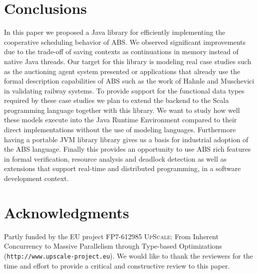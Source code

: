\section{Conclusions}
In this paper we proposed a Java library for efficiently implementing the cooperative scheduling behavior of ABS. We observed significant improvements due to the trade-off of saving contexts as continuations in memory instead of native Java threads. Our target for this library is modeling real case studies such as the auctioning agent system presented or applications that already use the formal description capabilities of ABS such as the work of Hahnle and Muschevici in validating railway systems\cite{railway}. To provide support for the functional data types required by these case studies we plan to extend the backend to the Scala programming language together with this library. We want to study how well these models execute into the Java Runtime Environment compared to their direct implementations without the use of modeling languages. Furthermore having a portable JVM library library gives us a basis for industrial adoption of the ABS language.  Finally this provides an opportunity to use ABS rich features in formal verification,  resource analysis and deadlock detection as well as extensions that support real-time and distributed programming, in a software development context. 

\section{Acknowledgments}
Partly funded by the EU project FP7-612985
\textsc{UpScale}: From Inherent Concurrency to Massive Parallelism
through Type-based Optimizations \\ (\texttt{http:/$\!$/www.upscale-project.eu}). We would like to thank the reviewers for the time and effort to provide a critical and constructive review to this paper.
